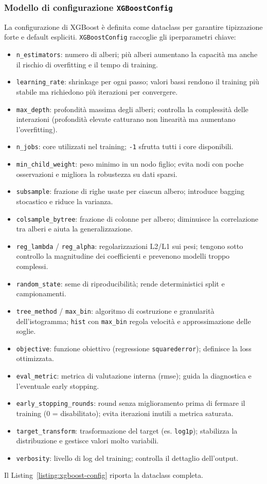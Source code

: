 \subsubsection{Modello di configurazione \texttt{XGBoostConfig}}
\label{sec:code-dataclass-config}
La configurazione di XGBoost è definita come dataclass per garantire tipizzazione forte e default espliciti. \texttt{XGBoostConfig} raccoglie gli iperparametri chiave:
\begin{itemize}
    \item \texttt{n\_estimators}: numero di alberi; più alberi aumentano la capacità ma anche il rischio di overfitting e il tempo di training.
    \item \texttt{learning\_rate}: shrinkage per ogni passo; valori bassi rendono il training più stabile ma richiedono più iterazioni per convergere.
    \item \texttt{max\_depth}: profondità massima degli alberi; controlla la complessità delle interazioni (profondità elevate catturano non linearità ma aumentano l’overfitting).
    \item \texttt{n\_jobs}: core utilizzati nel training; \texttt{-1} sfrutta tutti i core disponibili.
    \item \texttt{min\_child\_weight}: peso minimo in un nodo figlio; evita nodi con poche osservazioni e migliora la robustezza su dati sparsi.
    \item \texttt{subsample}: frazione di righe usate per ciascun albero; introduce bagging stocastico e riduce la varianza.
    \item \texttt{colsample\_bytree}: frazione di colonne per albero; diminuisce la correlazione tra alberi e aiuta la generalizzazione.
    \item \texttt{reg\_lambda} / \texttt{reg\_alpha}: regolarizzazioni L2/L1 sui pesi; tengono sotto controllo la magnitudine dei coefficienti e prevenono modelli troppo complessi.
    \item \texttt{random\_state}: seme di riproducibilità; rende deterministici split e campionamenti.
    \item \texttt{tree\_method} / \texttt{max\_bin}: algoritmo di costruzione e granularità dell’istogramma; \texttt{hist} con \texttt{max\_bin} regola velocità e approssimazione delle soglie.
    \item \texttt{objective}: funzione obiettivo (regressione \texttt{squarederror}); definisce la loss ottimizzata.
    \item \texttt{eval\_metric}: metrica di valutazione interna (\acrshort{rmse}); guida la diagnostica e l’eventuale early stopping.
    \item \texttt{early\_stopping\_rounds}: round senza miglioramento prima di fermare il training (0 = disabilitato); evita iterazioni inutili a metrica saturata.
    \item \texttt{target\_transform}: trasformazione del target (es. \texttt{log1p}); stabilizza la distribuzione e gestisce valori molto variabili.
    \item \texttt{verbosity}: livello di log del training; controlla il dettaglio dell’output.
\end{itemize}
Il Listing~\ref{listing:xgboost-config} riporta la dataclass completa.

